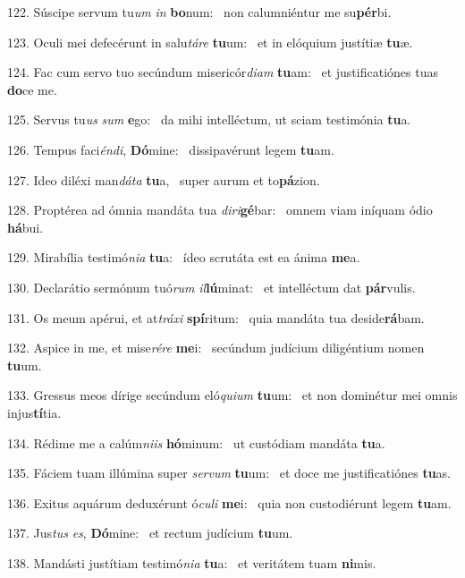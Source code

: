 122. Súscipe servum tu\textit{um} \textit{in} \textbf{bo}num: \ast\  non calumniéntur me su\textbf{pér}bi.\

123. Oculi mei defecérunt in salu\textit{tá}\textit{re} \textbf{tu}um: \ast\  et in elóquium justítiæ \textbf{tu}æ.\

124. Fac cum servo tuo secúndum misericór\textit{di}\textit{am} \textbf{tu}am: \ast\  et justificatiónes tuas \textbf{do}ce me.\

125. Servus tu\textit{us} \textit{sum} \textbf{e}go: \ast\  da mihi intelléctum, ut sciam testimónia \textbf{tu}a.\

126. Tempus faci\textit{én}\textit{di}, \textbf{Dó}mine: \ast\  dissipavérunt legem \textbf{tu}am.\

127. Ideo diléxi man\textit{dá}\textit{ta} \textbf{tu}a, \ast\  super aurum et to\textbf{pá}zion.\

128. Proptérea ad ómnia mandáta tua \textit{di}\textit{ri}\textbf{gé}bar: \ast\  omnem viam iníquam ódio \textbf{há}bui.\

129. Mirabília testimó\textit{ni}\textit{a} \textbf{tu}a: \ast\  ídeo scrutáta est ea ánima \textbf{me}a.\

130. Declarátio sermónum tuó\textit{rum} \textit{il}\textbf{lú}minat: \ast\  et intelléctum dat \textbf{pár}vulis.\

131. Os meum apérui, et at\textit{trá}\textit{xi} \textbf{spí}ritum: \ast\  quia mandáta tua deside\textbf{rá}bam.\

132. Aspice in me, et mise\textit{ré}\textit{re} \textbf{me}i: \ast\  secúndum judícium diligéntium nomen \textbf{tu}um.\

133. Gressus meos dírige secúndum eló\textit{qui}\textit{um} \textbf{tu}um: \ast\  et non dominétur mei omnis injus\textbf{tí}tia.\

134. Rédime me a calúm\textit{ni}\textit{is} \textbf{hó}minum: \ast\  ut custódiam mandáta \textbf{tu}a.\

135. Fáciem tuam illúmina super \textit{ser}\textit{vum} \textbf{tu}um: \ast\  et doce me justificatiónes \textbf{tu}as.\

136. Exitus aquárum deduxérunt ó\textit{cu}\textit{li} \textbf{me}i: \ast\  quia non custodiérunt legem \textbf{tu}am.\

137. Jus\textit{tus} \textit{es}, \textbf{Dó}mine: \ast\  et rectum judícium \textbf{tu}um.\

138. Mandásti justítiam testimó\textit{ni}\textit{a} \textbf{tu}a: \ast\  et veritátem tuam \textbf{ni}mis.\

